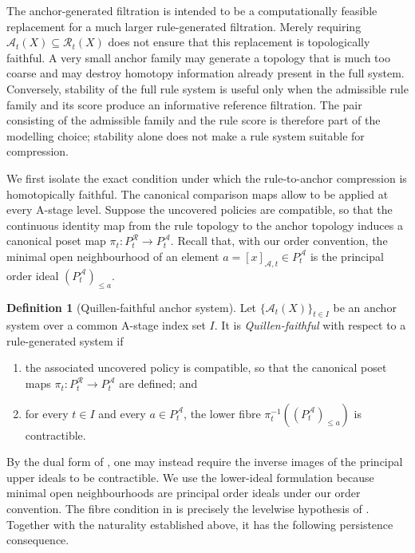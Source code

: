 \documentclass[a4paper,11pt]{article}
\theoremstyle{definition}
\newtheorem{definition}[definition]{Definition}
\theoremstyle{remark}
\begin{document}
The anchor-generated filtration is intended to be a computationally feasible replacement for a much larger rule-generated filtration. Merely requiring $\mathcal A_t(X)\subseteq\mathcal R_t(X)$ does not ensure that this replacement is topologically faithful. A very small anchor family may generate a topology that is much too coarse and may destroy homotopy information already present in the full system. Conversely, stability of the full rule system is useful only when the admissible rule family and its score produce an informative reference filtration.  The pair consisting of the admissible family and the rule score is therefore part of the modelling choice; stability alone does not make a rule system suitable for compression.

We first isolate the exact condition under which the rule-to-anchor compression is homotopically faithful.  The canonical comparison maps allow  to be applied at every A-stage level. Suppose the uncovered policies are compatible, so that the continuous identity map from the rule topology to the anchor topology induces a canonical poset map $\pi_t\colon P_t^{\mathcal R}\longrightarrow P_t^{\mathcal A}$. Recall that, with our order convention, the minimal open neighbourhood of an element $a=[x]_{\mathcal A,t}\in P_t^{\mathcal A}$ is the principal order ideal $(P_t^{\mathcal A})_{\leq a}$.

\begin{definition}[Quillen-faithful anchor system]
\label{def:quillen-faithful-anchor}
Let $\{\mathcal A_t(X)\}_{t\in I}$ be an anchor system over a common A-stage index set $I$.  It is \emph{Quillen-faithful} with respect to a rule-generated system if
\begin{enumerate}
\item the associated uncovered policy is compatible, so that the canonical poset maps $\pi_t\colon P_t^{\mathcal R}\longrightarrow P_t^{\mathcal A}$ are defined; and
\item for every $t\in I$ and every $a\in P_t^{\mathcal A}$, the lower fibre $\pi_t^{-1}((P_t^{\mathcal A})_{\leq a})$ is contractible.
\end{enumerate}
\end{definition}

By the dual form of , one may instead require the inverse images of the principal upper ideals to be contractible. We use the lower-ideal formulation because minimal open neighbourhoods are principal order ideals under our order convention. The fibre condition in  is precisely the levelwise hypothesis of .  Together with the naturality established above, it has the following persistence consequence.
\end{document}
